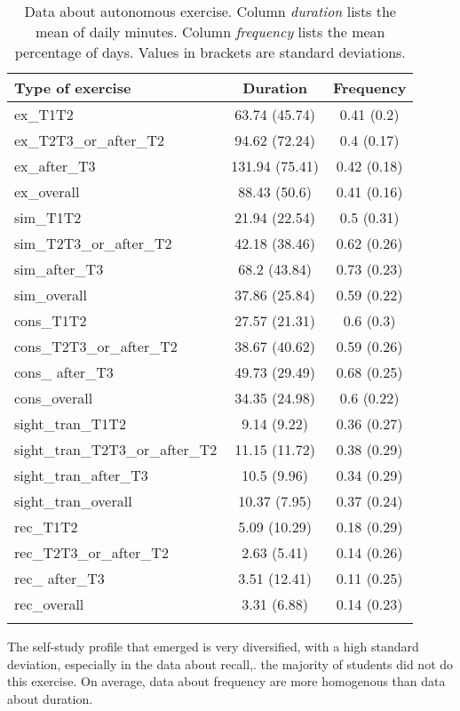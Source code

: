 \documentclass[output=paper]{../langscibook}
\begin{document}
\begin{table}
\begin{tabular}{lS[parse-numbers=false,separate-uncertainty=true,uncertainty-separator={\,}]
                 S[parse-numbers=false,separate-uncertainty=true,uncertainty-separator={\,}]}
\lsptoprule
Type of exercise & {Duration} & {Frequency}\\\midrule
ex\_T1T2 & 63.74 (45.74) & 0.41 (0.2)\\
ex\_T2T3\_or\_after\_T2 & 94.62 (72.24) & 0.4 (0.17)\\
ex\_after\_T3  & 131.94 (75.41) & 0.42 (0.18)\\
ex\_overall & 88.43 (50.6) & 0.41 (0.16)\\
sim\_T1T2 & 21.94 (22.54) & 0.5 (0.31)\\
sim\_T2T3\_or\_after\_T2 & 42.18 (38.46) & 0.62 (0.26)\\
sim\_after\_T3 & 68.2 (43.84) & 0.73 (0.23)\\
sim\_overall & 37.86 (25.84) & 0.59 (0.22)\\
cons\_T1T2 & 27.57 (21.31) & 0.6 (0.3)\\
cons\_T2T3\_or\_after\_T2 & 38.67 (40.62) & 0.59 (0.26)\\
cons\_ after\_T3 & 49.73 (29.49) & 0.68 (0.25)\\
cons\_overall & 34.35 (24.98) & 0.6 (0.22)\\
sight\_tran\_T1T2 & 9.14 (9.22) & 0.36 (0.27)\\
sight\_tran\_T2T3\_or\_after\_T2 & 11.15 (11.72) & 0.38 (0.29)\\
sight\_tran\_after\_T3  & 10.5 (9.96) & 0.34 (0.29)\\
sight\_tran\_overall & 10.37 (7.95) & 0.37 (0.24)\\
rec\_T1T2 & 5.09 (10.29) & 0.18 (0.29)\\
rec\_T2T3\_or\_after\_T2 & 2.63 (5.41) & 0.14 (0.26)\\
rec\_ after\_T3 & 3.51 (12.41) & 0.11 (0.25)\\
rec\_overall & 3.31 (6.88) & 0.14 (0.23)\\
\lspbottomrule
\end{tabular}
\caption{Data about autonomous exercise. Column \emph{duration} lists the mean of daily minutes. Column \emph{frequency} lists the mean percentage of days. Values in brackets are standard deviations.\label{tab:ghiselli:2}}
\end{table}

The self-study profile that emerged is very diversified, with a high standard deviation, especially in the data about  recall,. the majority of students did not do this exercise. On average, data about frequency are more homogenous than data about duration.
\end{document}
